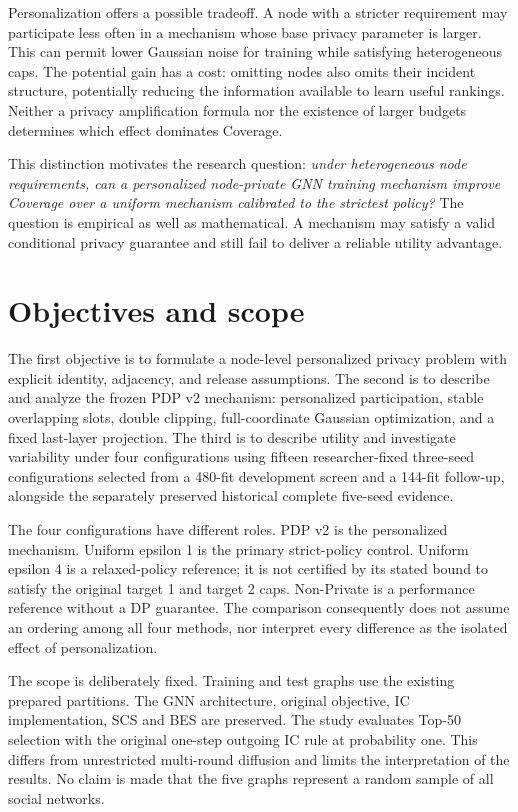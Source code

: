 Personalization offers a possible tradeoff. A node with a stricter requirement may participate less often in a mechanism whose base privacy parameter is larger. This can permit lower Gaussian noise for training while satisfying heterogeneous caps. The potential gain has a cost: omitting nodes also omits their incident structure, potentially reducing the information available to learn useful rankings. Neither a privacy amplification formula nor the existence of larger budgets determines which effect dominates Coverage.

This distinction motivates the research question: \emph{under heterogeneous node requirements, can a personalized node-private GNN training mechanism improve Coverage over a uniform mechanism calibrated to the strictest policy?} The question is empirical as well as mathematical. A mechanism may satisfy a valid conditional privacy guarantee and still fail to deliver a reliable utility advantage.

\section{Objectives and scope}
The first objective is to formulate a node-level personalized privacy problem with explicit identity, adjacency, and release assumptions. The second is to describe and analyze the frozen PDP v2 mechanism: personalized participation, stable overlapping slots, double clipping, full-coordinate Gaussian optimization, and a fixed last-layer projection. The third is to describe utility and investigate variability under four configurations using fifteen researcher-fixed three-seed configurations selected from a 480-fit development screen and a 144-fit follow-up, alongside the separately preserved historical complete five-seed evidence.

The four configurations have different roles. PDP v2 is the personalized mechanism. Uniform epsilon 1 is the primary strict-policy control. Uniform epsilon 4 is a relaxed-policy reference; it is not certified by its stated bound to satisfy the original target 1 and target 2 caps. Non-Private is a performance reference without a DP guarantee. The comparison consequently does not assume an ordering among all four methods, nor interpret every difference as the isolated effect of personalization.

The scope is deliberately fixed. Training and test graphs use the existing prepared partitions. The GNN architecture, original objective, IC implementation, SCS and BES are preserved. The study evaluates Top-50 selection with the original one-step outgoing IC rule at probability one. This differs from unrestricted multi-round diffusion and limits the interpretation of the results. No claim is made that the five graphs represent a random sample of all social networks.

